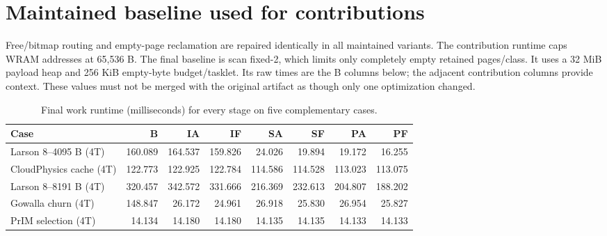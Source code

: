 \documentclass[conference,onecolumn]{IEEEtran}
\begin{document}
\section{Maintained baseline used for contributions}
Free/bitmap routing and empty-page reclamation are repaired identically in all maintained variants. The contribution runtime caps WRAM addresses at 65,536 B. The final baseline is scan fixed-2, which limits only completely empty retained pages/class. It uses a 32 MiB payload heap and 256 KiB empty-byte budget/tasklet. Its raw times are the B columns below; the adjacent contribution columns provide context. These values must not be merged with the original artifact as though only one optimization changed.
\begin{table}[!htbp]
\caption{Final work runtime (milliseconds) for every stage on five complementary cases.}\label{tab:final-main}
\centering\small
\begin{tabular}{lrrrrrrr}\toprule
Case & B & IA & IF & SA & SF & PA & PF \\ \midrule
Larson 8--4095 B (4T) & 160.089 & 164.537 & 159.826 & 24.026 & 19.894 & 19.172 & 16.255 \\
CloudPhysics cache (4T) & 122.773 & 122.925 & 122.784 & 114.586 & 114.528 & 113.023 & 113.075 \\
Larson 8--8191 B (4T) & 320.457 & 342.572 & 331.666 & 216.369 & 232.613 & 204.807 & 188.202 \\
Gowalla churn (4T) & 148.847 & 26.172 & 24.961 & 26.918 & 25.830 & 26.954 & 25.827 \\
PrIM selection (4T) & 14.134 & 14.180 & 14.180 & 14.135 & 14.135 & 14.133 & 14.133 \\
\bottomrule\end{tabular}
\par\vspace{2pt}{\footnotesize B: scan fixed-2; I: indexed; S: indexed plus 64 KiB slabs; P: indexed plus slabs plus pinned metadata. A uses adaptive interval 64; F retains at most two empty spans/class. All rows use four tasklets.}
\end{table}
\end{document}
